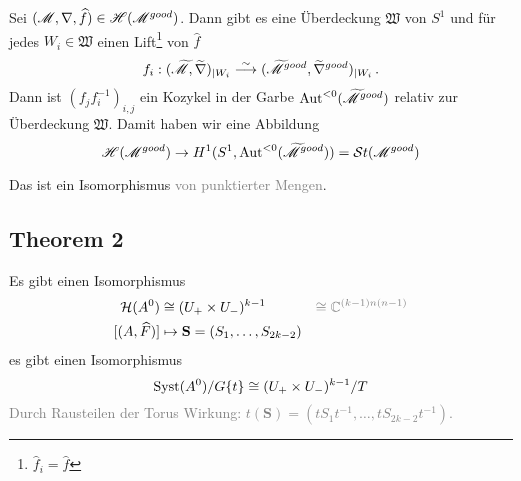 Sei $(\mathscr{M},\nabla,\widehat f)\in\mathscr{H}(\mathscr{M}^{good})$. Dann gibt es eine Überdeckung
$\mathfrak{W}$ von $S^1$ und für jedes $W_i\in\mathfrak{W}$ einen
Lift\footnote{$\hat f_i=\hat f$} von $\hat f$
\[
  f_i:(\widetilde{\mathscr{M}},\widetilde\nabla)_{|W_i}
  \overset{\sim}{\longrightarrow}
  (\widetilde{\mathscr{M}}^{good},\widetilde\nabla^{good})_{|W_i} \,.
\]
Dann ist $(f_jf_i^{-1})_{i,j}$ ein Kozykel in der Garbe
$\operatorname{Aut}^{<0}(\widetilde{\mathscr{M}}^{good})$ relativ zur Überdeckung $\mathfrak{W}$.
Damit haben wir eine Abbildung
\[
  \mathscr{H}(\mathscr{M}^{good})\to H^1(S^1,\operatorname{Aut}^{<0}(\widetilde{\mathscr{M}}^{good}))=\mathcal{S}{}t(\mathscr{M}^{good})
\]
\begin{tthm}
  Das ist ein Isomorphismus \textcolor{gray}{von punktierter Mengen}.
\end{tthm}
\pagebreak \subsection{Theorem 2} %
\begin{tthm}
  Es gibt einen Isomorphismus
  \begin{align*}
    \cH(A^0)&\cong(U_+\times U_-)^{k-1}
    &\textcolor{gray}{\cong\C^{(k-1)n(n-1)}}
  \\ [(A,\hat F)]&\mapsto\textbf{S}=(S_1,\dots,S_{2k-2})
  \end{align*}
  es gibt einen Isomorphismus
  \[
    \operatorname{Syst}(A^0)/G\{t\}\cong(U_+\times U_-)^{k-1}/T
  \]
  \textcolor{gray}{Durch Rausteilen der Torus 
    Wirkung: $t(\textbf{S})=(tS_1t^{-1},\dots,tS_{2k-2}t^{-1})$.}
\end{tthm}

